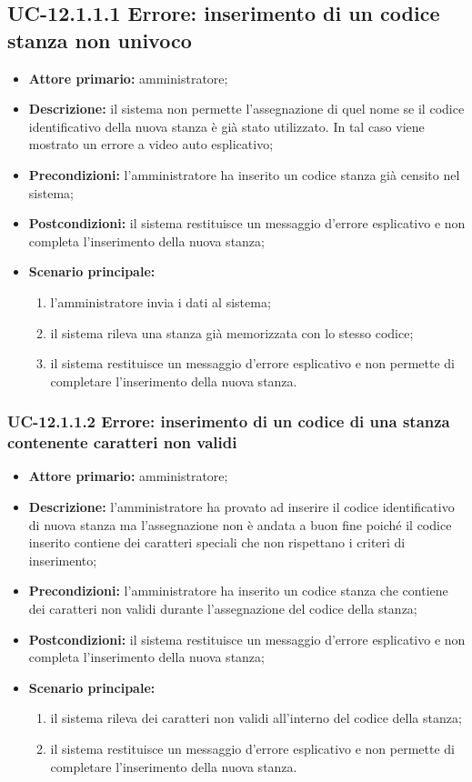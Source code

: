 \subsection{UC-12.1.1.1 Errore: inserimento di un codice stanza non univoco}
\begin{itemize}
	\item \textbf{Attore primario:} amministratore;
	\item \textbf{Descrizione:} il sistema non permette l'assegnazione di quel nome se il codice identificativo della nuova stanza è già stato utilizzato. In tal caso viene mostrato un errore a video auto esplicativo;
	\item \textbf{Precondizioni:} l'amministratore ha inserito un codice stanza già censito nel sistema;
	\item \textbf{Postcondizioni:} il sistema restituisce un messaggio d'errore esplicativo e non completa l'inserimento della nuova stanza;
	\item \textbf{Scenario principale:}
	      \begin{enumerate}
	      	      \item l'amministratore invia i dati al sistema;
		      \item il sistema rileva una stanza già memorizzata con lo stesso codice;
		      \item il sistema restituisce un messaggio d'errore esplicativo e non permette di completare l'inserimento della nuova stanza.
	      \end{enumerate}
\end{itemize}

\subsubsection{UC-12.1.1.2 Errore: inserimento di un codice di una stanza contenente caratteri non validi}
\begin{itemize}
	\item \textbf{Attore primario:} amministratore;
	\item \textbf{Descrizione:} l'amministratore ha provato ad inserire il codice identificativo di nuova stanza ma l'assegnazione non è andata a buon fine poiché il codice inserito contiene dei caratteri speciali che non rispettano i criteri di inserimento;
	\item \textbf{Precondizioni:} l'amministratore ha inserito un codice stanza che contiene dei caratteri non validi durante l'assegnazione del codice della stanza;
	\item \textbf{Postcondizioni:} il sistema restituisce un messaggio d'errore esplicativo e non completa l'inserimento della nuova stanza;
	\item \textbf{Scenario principale:}
	      \begin{enumerate}
		      \item il sistema rileva dei caratteri non validi all'interno del codice della stanza;
		      \item il sistema restituisce un messaggio d'errore esplicativo e non permette di completare l'inserimento della nuova stanza.
	      \end{enumerate}
\end{itemize}


